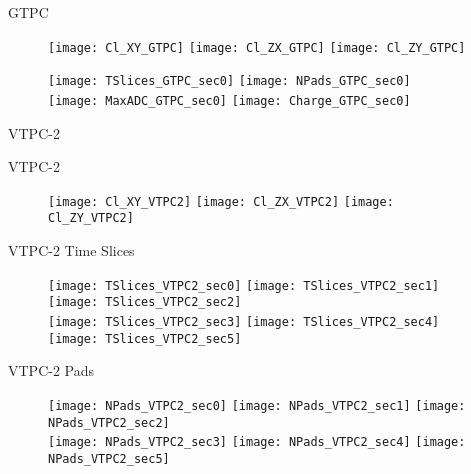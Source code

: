 \documentclass[11pt]{beamer}
\begin{document}
\begin{frame}
\centering
\Huge
GTPC
\end{frame}

\begin{frame}{}
\begin{figure}
\centering
\texttt{[image: Cl\_XY\_GTPC]}
\texttt{[image: Cl\_ZX\_GTPC]}
\texttt{[image: Cl\_ZY\_GTPC]}
\end{figure}
\end{frame}

\begin{frame}{}
\begin{figure}
\centering
\texttt{[image: TSlices\_GTPC\_sec0]}
\texttt{[image: NPads\_GTPC\_sec0]}\\
\texttt{[image: MaxADC\_GTPC\_sec0]}
\texttt{[image: Charge\_GTPC\_sec0]}
\end{figure}
\end{frame}

\begin{frame}
\centering
\Huge
VTPC-2
\end{frame}

\begin{frame}{VTPC-2}
\begin{figure}
\centering
\texttt{[image: Cl\_XY\_VTPC2]}
\texttt{[image: Cl\_ZX\_VTPC2]}
\texttt{[image: Cl\_ZY\_VTPC2]}
\end{figure}
\end{frame}

\begin{frame}{VTPC-2 Time Slices}
\begin{figure}
\centering
\texttt{[image: TSlices\_VTPC2\_sec0]}
\texttt{[image: TSlices\_VTPC2\_sec1]}
\texttt{[image: TSlices\_VTPC2\_sec2]}\\
\texttt{[image: TSlices\_VTPC2\_sec3]}
\texttt{[image: TSlices\_VTPC2\_sec4]}
\texttt{[image: TSlices\_VTPC2\_sec5]}
\end{figure}
\end{frame}

\begin{frame}{VTPC-2 Pads}
\begin{figure}
\centering
\texttt{[image: NPads\_VTPC2\_sec0]}
\texttt{[image: NPads\_VTPC2\_sec1]}
\texttt{[image: NPads\_VTPC2\_sec2]}\\
\texttt{[image: NPads\_VTPC2\_sec3]}
\texttt{[image: NPads\_VTPC2\_sec4]}
\texttt{[image: NPads\_VTPC2\_sec5]}
\end{figure}
\end{frame}
\end{document}
